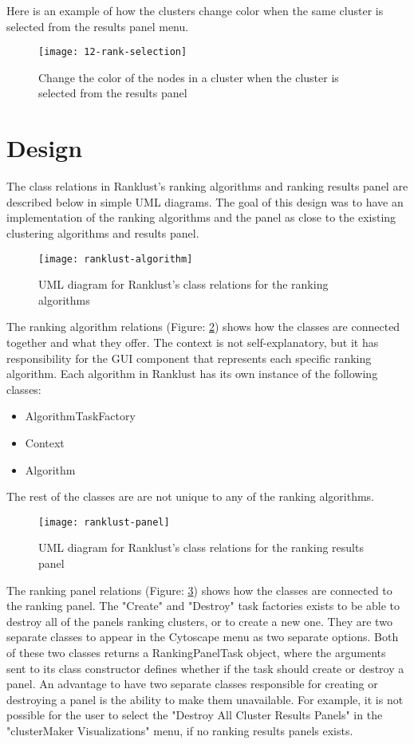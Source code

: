 Here is an example of how the clusters change color when the same cluster is
selected from the results panel menu.
\begin{figure}[H]
    \texttt{[image: 12-rank-selection]}
    \caption{Change the color of the nodes in a cluster when the cluster is
    selected from the results panel}
    \label{fig:rank-selection}
\end{figure}

\section{Design}
The class relations in Ranklust's ranking algorithms and ranking results panel
are described below in simple UML diagrams. The goal of this design was to have
an implementation of the ranking algorithms and the panel as close to the
existing clustering algorithms and results panel. 

\begin{figure}[H]
    \texttt{[image: ranklust-algorithm]}
    \caption{UML diagram for Ranklust's class relations for the ranking
    algorithms}
    \label{fig:rank-alg}
\end{figure}

The ranking algorithm relations (Figure: \ref{fig:rank-alg}) shows how the
classes are connected together and what they offer. The context is not
self-explanatory, but it has responsibility for the GUI component that
represents each specific ranking algorithm. Each algorithm in Ranklust has its
own instance of the following classes:

\begin{itemize}
    \item AlgorithmTaskFactory
    \item Context
    \item Algorithm
\end{itemize}

The rest of the classes are are not unique to any of the ranking algorithms.

\begin{figure}[H]
    \texttt{[image: ranklust-panel]}
    \caption{UML diagram for Ranklust's class relations for the ranking results
    panel}
    \label{fig:rank-panel}
\end{figure}

The ranking panel relations (Figure: \ref{fig:rank-panel}) shows how the classes
are connected to the ranking panel. The "Create" and "Destroy" task factories
exists to be able to destroy all of the panels ranking clusters, or to create
a new one. They are two separate classes to appear in the Cytoscape menu as two
separate options. Both of these two classes returns a RankingPanelTask object,
where the arguments sent to its class constructor defines whether if the task
should create or destroy a panel. An advantage to have two separate classes
responsible for creating or destroying a panel is the ability to make them
unavailable. For example, it is not possible for the user to select the "Destroy
All Cluster Results Panels" in the "clusterMaker Visualizations" menu, if no
ranking results panels exists.

